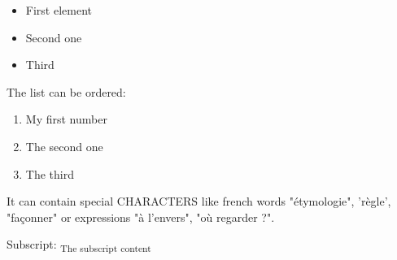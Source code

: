 \documentclass[letter,titlepage,oneside,11pt]{report}%
\begin{document}
\begin{itemize}%
\item First element%
\item Second one%
\item Third%
\end{itemize}%
\par%
\begin{FlushLeft}%
The list can be ordered:%
\end{FlushLeft}%
\begin{enumerate}%
\item My first number%
\item The second one%
\item The third%
\end{enumerate}%
\par%
\begin{FlushLeft}%
It can contain special CHARACTERS like french words "étymologie", 'règle', "façonner" or expressions "à l'envers", "où regarder ?".%
\end{FlushLeft}%
\par%
\begin{FlushLeft}%
Subscript: \textsubscript{The subscript content}%
\end{FlushLeft}%
\end{document}
